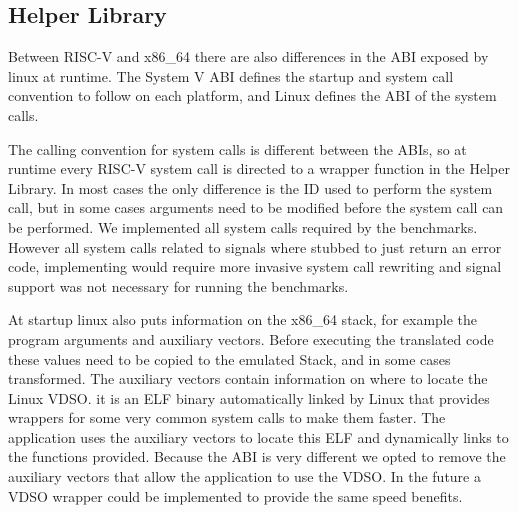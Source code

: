 \documentclass[course=eragp]{aspdoc}
\begin{document}
\subsection{Helper Library}\label{helper}

Between RISC-V and x86\_64 there are also differences in the ABI exposed by linux at runtime.
The System V ABI defines the startup and system call convention to follow on each platform, and Linux defines the ABI of the system calls. %

\par

The calling convention for system calls is different between the ABIs, so at runtime every RISC-V system call is directed to a wrapper function in the Helper Library.
In most cases the only difference is the ID used to perform the system call, but in some cases arguments need to be modified before the system call can be performed.
We implemented all system calls required by the benchmarks.
However all system calls related to signals where stubbed to just return an error code, implementing would require more invasive system call rewriting and signal support was not necessary for running the benchmarks.

\par

At startup linux also puts information on the x86\_64 stack, for example the program arguments and auxiliary vectors. %
Before executing the translated code these values need to be copied to the emulated Stack, and in some cases transformed.
The auxiliary vectors contain information on where to locate the Linux VDSO\cite{man_vdso}.
it is an ELF binary automatically linked by Linux that provides wrappers for some very common system calls to make them faster.
The application uses the auxiliary vectors to locate this ELF and dynamically links to the functions provided.
Because the ABI is very different we opted to remove the auxiliary vectors that allow the application to use the VDSO.
In the future a VDSO wrapper could be implemented to provide the same speed benefits.

\end{document}
